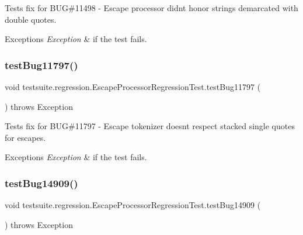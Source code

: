 Tests fix for B\+UG\#11498 -\/ Escape processor didn\textquotesingle{}t honor strings demarcated with double quotes.


\begin{DoxyExceptions}{Exceptions}
{\em Exception} & if the test fails. \\
\hline
\end{DoxyExceptions}
\mbox{\label{classtestsuite_1_1regression_1_1_escape_processor_regression_test_afce160178129cd6e5455a7da48112250}} 
\subsubsection{\texorpdfstring{test\+Bug11797()}{testBug11797()}}
{\footnotesize\ttfamily void testsuite.\+regression.\+Escape\+Processor\+Regression\+Test.\+test\+Bug11797 (\begin{DoxyParamCaption}{ }\end{DoxyParamCaption}) throws Exception}

Tests fix for B\+UG\#11797 -\/ Escape tokenizer doesn\textquotesingle{}t respect stacked single quotes for escapes.


\begin{DoxyExceptions}{Exceptions}
{\em Exception} & if the test fails. \\
\hline
\end{DoxyExceptions}
\mbox{\label{classtestsuite_1_1regression_1_1_escape_processor_regression_test_ae70f225ac0aefbe783d3f4a137c0b66d}} 
\subsubsection{\texorpdfstring{test\+Bug14909()}{testBug14909()}}
{\footnotesize\ttfamily void testsuite.\+regression.\+Escape\+Processor\+Regression\+Test.\+test\+Bug14909 (\begin{DoxyParamCaption}{ }\end{DoxyParamCaption}) throws Exception}


